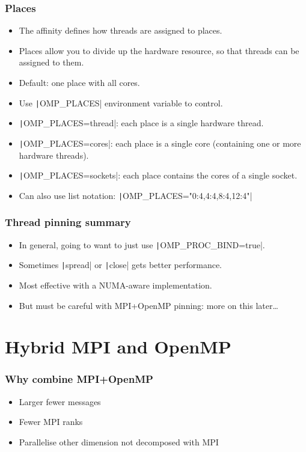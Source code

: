 \documentclass{beamer}
\begin{document}
\begin{frame}
\frametitle{Places}
\begin{itemize}
  \item The affinity defines how threads are assigned to places.
  \item Places allow you to divide up the hardware resource, so that threads can be assigned to them.
  \item Default: one place with all cores.
  \item Use \texttt|OMP_PLACES| environment variable to control.
  \item \texttt|OMP_PLACES=thread|: each place is a single hardware thread.
  \item \texttt|OMP_PLACES=cores|: each place is a single core (containing one or more hardware threads).
  \item \texttt|OMP_PLACES=sockets|: each place contains the cores of a single socket.
  \item Can also use list notation: \texttt|OMP_PLACES="{0:4},{4:4},{8:4},{12:4}"|
\end{itemize}
\end{frame}

\begin{frame}
\frametitle{Thread pinning summary}
\begin{itemize}
  \item In general, going to want to just use \texttt|OMP_PROC_BIND=true|.
  \item Sometimes \texttt|spread| or \texttt|close| gets better performance.
  \item Most effective with a NUMA-aware implementation.
  \item But must be careful with MPI+OpenMP pinning: more on this later\dots
\end{itemize}
\end{frame}

\section{Hybrid MPI and OpenMP}
\begin{frame}
\frametitle{Why combine MPI+OpenMP}
\begin{itemize}
  \item Larger fewer messages
  \item Fewer MPI ranks
  \item Parallelise other dimension not decomposed with MPI
\end{itemize}
\end{frame}
\end{document}
